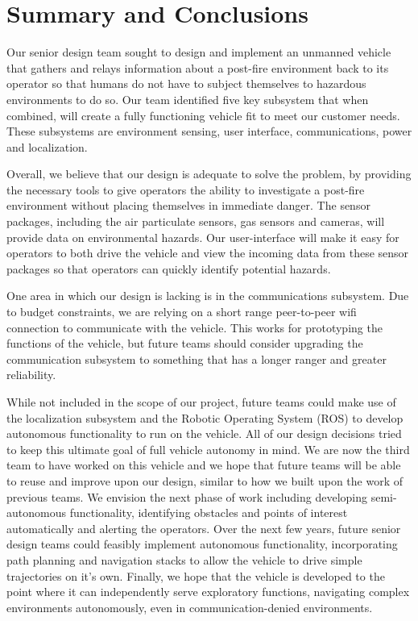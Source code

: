 \chapter{Summary and Conclusions}

Our senior design team sought to design and implement an unmanned vehicle that gathers and relays information about a post-fire environment back to its operator so that humans do not have to subject themselves to hazardous environments to do so. Our team identified five key subsystem that when combined, will create a fully functioning vehicle fit to meet our customer needs.  These subsystems are environment sensing, user interface, communications, power and localization.

Overall, we believe that our design is adequate to solve the problem, by providing the necessary tools to give operators the ability to investigate a post-fire environment without placing themselves in immediate danger. The sensor packages, including the air particulate sensors, gas sensors and cameras, will provide data on environmental hazards.  Our user-interface will make it easy for operators to both drive the vehicle and view the incoming data from these sensor packages so that operators can quickly identify potential hazards.

One area in which our design is lacking is in the communications subsystem.  Due to budget constraints, we are relying on a short range peer-to-peer wifi connection to communicate with the vehicle.  This works for prototyping the functions of the vehicle, but future teams should consider upgrading the communication subsystem to something that has a longer ranger and greater reliability.  

While not included in the scope of our project, future teams could make use of the localization subsystem and the Robotic Operating System (ROS) to develop autonomous functionality to run on the vehicle. All of our design decisions tried to keep this ultimate goal of full vehicle autonomy in mind. We are now the third team to have worked on this vehicle and we hope that future teams will be able to reuse and improve upon our design, similar to how we built upon the work of previous teams. We envision the next phase of work including developing semi-autonomous functionality, identifying obstacles and points of interest automatically and alerting the operators. Over the next few years, future senior design teams could feasibly implement autonomous functionality, incorporating path planning and navigation stacks to allow the vehicle to drive simple trajectories on it's own. Finally, we hope that the vehicle is developed to the point where it can independently serve exploratory functions, navigating complex environments autonomously, even in communication-denied environments.

